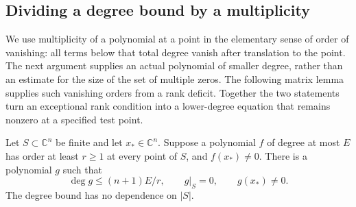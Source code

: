 \subsection{Dividing a degree bound by a multiplicity}

We use multiplicity of a polynomial at a point in the elementary sense of order of vanishing: all terms below that total degree vanish after translation to the point.  The next argument supplies an actual polynomial of smaller degree, rather than an estimate for the size of the set of multiple zeros.  The following matrix lemma supplies such vanishing orders from a rank deficit.  Together the two statements turn an exceptional rank condition into a lower-degree equation that remains nonzero at a specified test point.

\begin{lemma}\label{lem:poly-compression}
Let $S\subset\mathbb{C}^n$ be finite and let $x_*\in\mathbb{C}^n$.  Suppose a polynomial $f$ of degree at most $E$ has order at least $r\ge1$ at every point of $S$, and $f(x_*)\ne0$.  There is a polynomial $g$ such that
\[
 \deg g\le (n+1)E/r,\qquad
 g|_S=0,\qquad g(x_*)\ne0.
\]
The degree bound has no dependence on $|S|$.
\end{lemma}

